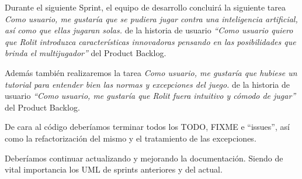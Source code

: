 \documentclass[
]{article}
\begin{document}
Durante el siguiente Sprint, el equipo de desarrollo concluirá la
siguiente tarea \emph{Como usuario, me gustaría que se pudiera jugar
contra una inteligencia artificial, así como que ellas jugaran solas.}
de la historia de usuario \emph{``Como usuario quiero que Rolit
introduzca características innovadoras pensando en las posibilidades que
brinda el multijugador''} del Product Backlog.

Además también realizaremos la tarea \emph{Como usuario, me gustaría que
hubiese un tutorial para entender bien las normas y excepciones del
juego.} de la historia de usuario \emph{``Como usuario, me gustaría que
Rolit fuera intuitivo y cómodo de jugar''} del Product Backlog.

De cara al código deberíamos terminar todos los TODO, FIXME e
``issues'', así como la refactorización del mismo y el tratamiento de
las excepciones.

Deberíamos continuar actualizando y mejorando la documentación. Siendo
de vital importancia los UML de sprints anteriores y del actual.
\end{document}

